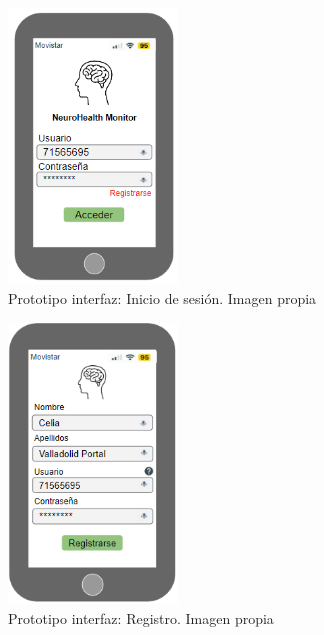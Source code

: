 \begin{figure}[H]
    \centering
    \includegraphics[width=0.4\textwidth]{img/appinicio.PNG}
    \caption{Prototipo interfaz: Inicio de sesión. Imagen propia}
    \label{fig:inise}
\end{figure}

\begin{figure}[h]
    \centering
    \includegraphics[width=0.4\textwidth]{img/registroapp.PNG}
    \caption{Prototipo interfaz: Registro. Imagen propia}
    \label{fig:regis}
\end{figure}

